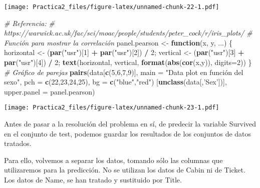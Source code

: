 \documentclass[]{article}
\newenvironment{Shaded}{\begin{snugshade}}{\end{snugshade}}
\newcommand{\KeywordTok}[1]{\textcolor[rgb]{0.13,0.29,0.53}{\textbf{#1}}}
\newcommand{\DataTypeTok}[1]{\textcolor[rgb]{0.13,0.29,0.53}{#1}}
\newcommand{\DecValTok}[1]{\textcolor[rgb]{0.00,0.00,0.81}{#1}}
\newcommand{\StringTok}[1]{\textcolor[rgb]{0.31,0.60,0.02}{#1}}
\newcommand{\CommentTok}[1]{\textcolor[rgb]{0.56,0.35,0.01}{\textit{#1}}}
\newcommand{\ControlFlowTok}[1]{\textcolor[rgb]{0.13,0.29,0.53}{\textbf{#1}}}
\newcommand{\OperatorTok}[1]{\textcolor[rgb]{0.81,0.36,0.00}{\textbf{#1}}}
\newcommand{\NormalTok}[1]{#1}
\begin{document}
\texttt{[image: Practica2\_files/figure-latex/unnamed-chunk-22-1.pdf]}

\begin{Shaded}
\begin{Highlighting}[]
\CommentTok{# Referencia:}
\CommentTok{# https://warwick.ac.uk/fac/sci/moac/people/students/peter_cock/r/iris_plots/}
\CommentTok{# Función para mostrar la correlación}
\NormalTok{panel.pearson <-}\StringTok{ }\ControlFlowTok{function}\NormalTok{(x, y, ...) \{}
\NormalTok{horizontal <-}\StringTok{ }\NormalTok{(}\KeywordTok{par}\NormalTok{(}\StringTok{"usr"}\NormalTok{)[}\DecValTok{1}\NormalTok{] }\OperatorTok{+}\StringTok{ }\KeywordTok{par}\NormalTok{(}\StringTok{"usr"}\NormalTok{)[}\DecValTok{2}\NormalTok{]) }\OperatorTok{/}\StringTok{ }\DecValTok{2}\NormalTok{;}
\NormalTok{vertical <-}\StringTok{ }\NormalTok{(}\KeywordTok{par}\NormalTok{(}\StringTok{"usr"}\NormalTok{)[}\DecValTok{3}\NormalTok{] }\OperatorTok{+}\StringTok{ }\KeywordTok{par}\NormalTok{(}\StringTok{"usr"}\NormalTok{)[}\DecValTok{4}\NormalTok{]) }\OperatorTok{/}\StringTok{ }\DecValTok{2}\NormalTok{;}
\KeywordTok{text}\NormalTok{(horizontal, vertical, }\KeywordTok{format}\NormalTok{(}\KeywordTok{abs}\NormalTok{(}\KeywordTok{cor}\NormalTok{(x,y)), }\DataTypeTok{digits=}\DecValTok{2}\NormalTok{))}
\NormalTok{\}}
\CommentTok{# Gráfico de parejas}
\KeywordTok{pairs}\NormalTok{(data[}\KeywordTok{c}\NormalTok{(}\DecValTok{5}\NormalTok{,}\DecValTok{6}\NormalTok{,}\DecValTok{7}\NormalTok{,}\DecValTok{9}\NormalTok{)], }\DataTypeTok{main =} \StringTok{"Data plot en función del sexo"}\NormalTok{, }\DataTypeTok{pch =} \KeywordTok{c}\NormalTok{(}\DecValTok{22}\NormalTok{,}\DecValTok{23}\NormalTok{,}\DecValTok{24}\NormalTok{,}\DecValTok{25}\NormalTok{),}
      \DataTypeTok{bg =} \KeywordTok{c}\NormalTok{(}\StringTok{"blue"}\NormalTok{,}\StringTok{"red"}\NormalTok{) [}\KeywordTok{unclass}\NormalTok{(data[,}\StringTok{'Sex'}\NormalTok{])],}
      \DataTypeTok{upper.panel =}\NormalTok{ panel.pearson)}
\end{Highlighting}
\end{Shaded}

\texttt{[image: Practica2\_files/figure-latex/unnamed-chunk-23-1.pdf]}

Antes de pasar a la resolución del problema en sí, de predecir la
variable Survived en el conjunto de test, podemos guardar los resultados
de los conjuntos de datos tratados.

Para ello, volvemos a separar los datos, tomando sólo las columnas que
utilizaremos para la predicción. No se utilizan los datos de Cabin ni de
Ticket. Los datos de Name, se han tratado y sustituido por Title.
\end{document}
